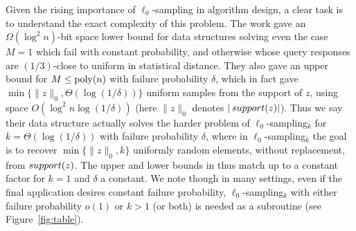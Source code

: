 Given the rising importance of $\ell_0$-sampling in algorithm design, a clear task is to understand the exact complexity of this problem. The work \cite{JowhariST11} gave an $\Omega(\log^2 n)$-bit space lower bound for data structures solving even the case $M=1$ which fail with constant probability, and otherwise whose query responses are $(1/3)$-close to uniform in statistical distance. They also gave an upper bound for $M \le {\mathrm{poly}}(n)$ with failure probability $\delta$, which in fact gave $\min\{\|z\|_0, \Theta(\log(1/\delta))\}$ uniform samples from the support of $z$, using space $O(\log^2 n \log(1/\delta))$ (here $\|z\|_0$ denotes $|\mathop{support}(z)|$). Thus we say their data structure actually solves the harder problem of $\ell_0$-sampling$_k$ for $k =\Theta(\log(1/\delta))$ with failure probability $\delta$, where in $\ell_0$-sampling$_k$ the goal is to recover $\min\{\|z\|_0, k\}$ uniformly random elements, without replacement, from $\mathop{support}(z)$.  The upper and lower bounds in \cite{JowhariST11} thus match up to a constant factor for $k = 1$ and $\delta$ a constant. We note though in many settings, even if the final application desires constant failure probability, $\ell_0$-sampling$_k$ with either failure probability $o(1)$ or $k>1$ (or both) is needed as a subroutine (see Figure~\ref{fig:table}).


